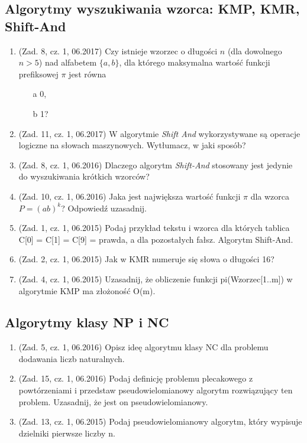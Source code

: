 \documentclass[10pt]{article}%
\begin{document}
\subsection*{Algorytmy wyszukiwania wzorca: KMP, KMR, Shift-And}

\begin{enumerate}

\item (Zad. 8, cz. 1, 06.2017) Czy istnieje wzorzec o długości $n$ (dla dowolnego $n>5$) nad alfabetem $\{a,b\}$, dla którego maksymalna wartość funkcji prefiksowej $\pi$ jest równa 
\begin{itemize}
\item[a] 0,
\item[b] 1?
\end{itemize}

\item (Zad. 11, cz. 1, 06.2017) W algorytmie \emph{Shift And} wykorzystywane są operacje logiczne na słowach maszynowych. Wytłumacz, w jaki sposób?

\item (Zad. 8, cz. 1, 06.2016) Dlaczego algorytm \textit{Shift-And} stosowany jest jedynie do wyszukiwania krótkich wzorców?

\item (Zad. 10, cz. 1, 06.2016) Jaka jest największa wartość funkcji $\pi$ dla wzorca $ P = (ab)^k$? Odpowiedź uzasadnij.

\item (Zad. 1, cz. 1, 06.2015) Podaj przykład tekstu i wzorca dla których tablica C[0] = C[1] = C[9] = prawda, a dla pozostałych fałsz. Algorytm Shift-And.

\item (Zad. 2, cz. 1, 06.2015) Jak w KMR numeruje się słowa o długości 16?

\item (Zad. 4, cz. 1, 06.2015) Uzasadnij, że obliczenie funkcji pi(Wzorzec[1..m]) w algorytmie KMP ma złożoność O(m).

\end{enumerate}


\subsection*{Algorytmy klasy NP i NC}

\begin{enumerate}

\item (Zad. 5, cz. 1, 06.2016) Opisz ideę algorytmu klasy NC dla problemu dodawania liczb naturalnych.

\item (Zad. 15, cz. 1, 06.2016) Podaj definicję problemu plecakowego z powtórzeniami i przedstaw pseudowielomianowy algorytm rozwiązujący ten problem. Uzasadnij, że jest on pseudowielomianowy.

\item (Zad. 13, cz. 1, 06.2015) Podaj pseudowielomianowy algorytm, który wypisuje dzielniki pierwsze liczby n.

\end{enumerate}
\end{document}
